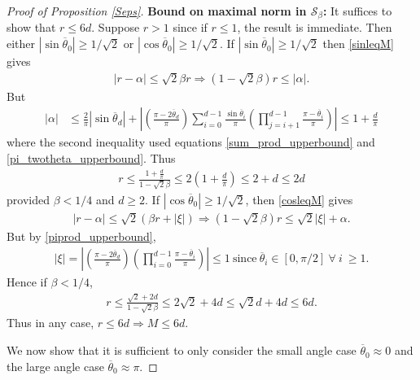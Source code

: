 \documentclass[11pt]{article}
\newcommand{\al}{\alpha}
\newcommand{\Seps}{\mathcal{S}}
\theoremstyle{remark}
\begin{document}
\begin{proof}[Proof of Proposition \ref{Seps}]
\textbf{Bound on maximal norm in $\Seps_{\beta}$:} It suffices to show that $r \leqslant 6d$. Suppose $r > 1$ since if $r \leqslant 1$, the result is immediate. Then either $|\sin \overline{\theta}_0| \geqslant 1/\sqrt{2}$ or $|\cos \overline{\theta}_0| \geqslant 1/\sqrt{2}$. If $|\sin \overline{\theta}_0| \geqslant 1/\sqrt{2}$ then \eqref{sinleqM} gives \begin{align*}
|r - \al| \leqslant \sqrt{2}\beta r \Longrightarrow (1-\sqrt{2}\beta)r \leqslant |\al|.
\end{align*} But \begin{align*}
|\al| & \leqslant \frac{2}{\pi}|\sin \overline{\theta}_d| + \left|\left(\frac{\pi - 2\overline{\theta}_d}{\pi}\right) \sum_{i=0}^{d-1} \frac{\sin \overline{\theta}_i}{\pi}\left(\prod_{j=i+1}^{d-1} \frac{\pi - \overline{\theta}_i}{\pi}\right)\right| \leqslant 1 + \frac{d}{\pi}
\end{align*} where the second inequality used equations \eqref{sum_prod_upperbound} and \eqref{pi_twotheta_upperbound}. Thus \begin{align*}
r \leqslant \frac{1+ \frac{d}{\pi}}{1 - \sqrt{2}\beta} \leqslant 2\left(1 + \frac{d}{\pi}\right) \leqslant 2 + d \leqslant 2d
\end{align*} provided $\beta < 1/4$ and $d \geqslant 2$. If $|\cos \overline{\theta}_0 | \geqslant 1/\sqrt{2}$, then \eqref{cosleqM} gives \begin{align*}
|r - \al| \leqslant \sqrt{2}(\beta r + |\xi|) \Longrightarrow (1 - \sqrt{2}\beta)r \leqslant \sqrt{2}|\xi| + \al.
\end{align*} But by \eqref{piprod_upperbound},  \begin{align*}
|\xi| = \left|\left(\frac{\pi - 2\overline{\theta}_d}{\pi}\right) \left(\prod_{i=0}^{d-1} \frac{\pi - \overline{\theta}_i}{\pi}\right)\right| \leqslant 1\ \text{since}\ \overline{\theta}_i  \in [0,\pi/2]\ \forall\ i\ \geqslant 1.
\end{align*} Hence if $\beta < 1/4$, \begin{align*}
r \leqslant \frac{\sqrt{2} + 2d}{1 - \sqrt{2}\beta} \leqslant 2\sqrt{2} + 4d \leqslant \sqrt{2}d + 4d \leqslant 6d.
\end{align*} Thus in any case, $r \leqslant 6d \Longrightarrow M \leqslant 6d$. 

We now show that it is sufficient to only consider the small angle case $\overline{\theta}_0 \approx 0$ and the large angle case $\overline{\theta}_0 \approx \pi$.


\end{proof}
\end{document}
